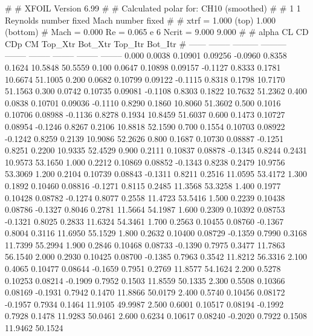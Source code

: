 #  
#       XFOIL         Version 6.99
#  
# Calculated polar for: CH10 (smoothed)                                 
#  
# 1 1 Reynolds number fixed          Mach number fixed         
#  
# xtrf =   1.000 (top)        1.000 (bottom)  
# Mach =   0.000     Re =     0.065 e 6     Ncrit =   9.000  9.000
#  
#   alpha    CL        CD       CDp       CM     Top_Xtr  Bot_Xtr  Top_Itr  Bot_Itr
#  ------ -------- --------- --------- -------- -------- -------- -------- --------
   0.000   0.0038   0.10901   0.09256  -0.0960   0.8358   0.1624  10.5848  50.5559
   0.100   0.0647   0.10898   0.09157  -0.1127   0.8333   0.1781  10.6674  51.1005
   0.200   0.0682   0.10799   0.09122  -0.1115   0.8318   0.1798  10.7170  51.1563
   0.300   0.0742   0.10735   0.09081  -0.1108   0.8303   0.1822  10.7632  51.2362
   0.400   0.0838   0.10701   0.09036  -0.1110   0.8290   0.1860  10.8060  51.3602
   0.500   0.1016   0.10706   0.08988  -0.1136   0.8278   0.1934  10.8459  51.6037
   0.600   0.1473   0.10727   0.08954  -0.1246   0.8267   0.2106  10.8818  52.1590
   0.700   0.1554   0.10703   0.08922  -0.1242   0.8259   0.2139  10.9086  52.2626
   0.800   0.1687   0.10730   0.08887  -0.1251   0.8251   0.2200  10.9335  52.4529
   0.900   0.2111   0.10837   0.08878  -0.1345   0.8244   0.2431  10.9573  53.1650
   1.000   0.2212   0.10869   0.08852  -0.1343   0.8238   0.2479  10.9756  53.3069
   1.200   0.2104   0.10739   0.08843  -0.1311   0.8211   0.2516  11.0595  53.4172
   1.300   0.1892   0.10460   0.08816  -0.1271   0.8115   0.2485  11.3568  53.3258
   1.400   0.1977   0.10428   0.08782  -0.1274   0.8077   0.2558  11.4723  53.5416
   1.500   0.2239   0.10438   0.08786  -0.1327   0.8046   0.2781  11.5664  54.1987
   1.600   0.2309   0.10392   0.08753  -0.1321   0.8025   0.2833  11.6324  54.3461
   1.700   0.2563   0.10455   0.08760  -0.1367   0.8004   0.3116  11.6950  55.1529
   1.800   0.2632   0.10400   0.08729  -0.1359   0.7990   0.3168  11.7399  55.2994
   1.900   0.2846   0.10468   0.08733  -0.1390   0.7975   0.3477  11.7863  56.1540
   2.000   0.2930   0.10425   0.08700  -0.1385   0.7963   0.3542  11.8212  56.3316
   2.100   0.4065   0.10477   0.08644  -0.1659   0.7951   0.2769  11.8577  54.1624
   2.200   0.5278   0.10253   0.08214  -0.1909   0.7952   0.1503  11.8559  50.1335
   2.300   0.5508   0.10366   0.08169  -0.1931   0.7942   0.1470  11.8866  50.0179
   2.400   0.5740   0.10456   0.08172  -0.1957   0.7934   0.1464  11.9105  49.9987
   2.500   0.6001   0.10517   0.08194  -0.1992   0.7928   0.1478  11.9283  50.0461
   2.600   0.6234   0.10617   0.08240  -0.2020   0.7922   0.1508  11.9462  50.1524
